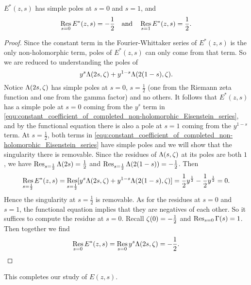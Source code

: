       \begin{proposition}\label{equ:completed_real-analytic_Eisenstein_series_residues}
        $E^{\ast}(z,s)$ has simple poles at $s = 0$ and $s = 1$, and
        \[
          \operatorname*{\mathrm{Res}}_{s = 0}E^{\ast}(z,s) = -\frac{1}{2} \quad \text{and} \quad \operatorname*{\mathrm{Res}}_{s = 1}E^{\ast}(z,s) = \frac{1}{2}.
        \]
      \end{proposition}
      \begin{proof}
        Since the constant term in the Fourier-Whittaker series of $E^{\ast}(z,s)$ is the only non-holomorphic term, poles of $E^{\ast}(z,s)$ can only come from that term. So we are reduced to understanding the poles of
        \begin{equation}\label{equ:constant_coefficient_of_completed_non-holomorphic_Eisenstein_series}
          y^{s}\Lambda(2s,\zeta)+y^{1-s}\Lambda(2(1-s),\zeta).
        \end{equation}
        Notice $\Lambda(2s,\zeta)$ has simple poles at $s = 0$, $s = \frac{1}{2}$ (one from the Riemann zeta function and one from the gamma factor) and no others. It follows that $E^{\ast}(z,s)$ has a simple pole at $s = 0$ coming from the $y^{s}$ term in
        \cref{equ:constant_coefficient_of_completed_non-holomorphic_Eisenstein_series}, and by the functional equation there is also a pole at $s = 1$ coming from the $y^{1-s}$ term. At $s = \frac{1}{2}$, both terms in \cref{equ:constant_coefficient_of_completed_non-holomorphic_Eisenstein_series} have simple poles and we will show that the singularity there is removable. Since the residues of $\Lambda(s,\zeta)$ at its poles are both $1$, we have $\operatorname*{\mathrm{Res}}_{s = \frac{1}{2}}\Lambda(2s) = \frac{1}{2}$ and $\operatorname*{\mathrm{Res}}_{s = \frac{1}{2}}\Lambda(2(1-s)) = -\frac{1}{2}$. Then
        \[
          \operatorname*{\mathrm{Res}}_{s = \frac{1}{2}}E^{\ast}(z,s) = \operatorname*{\mathrm{Res}}_{s = \frac{1}{2}}[y^{s}\Lambda(2s,\zeta)+y^{1-s}\Lambda(2(1-s),\zeta)] = \frac{1}{2}y^{\frac{1}{2}}-\frac{1}{2}y^{\frac{1}{2}} = 0.
        \]
        Hence the singularity at $s = \frac{1}{2}$ is removable. As for the residues at $s = 0$ and $s = 1$, the functional equation implies that they are negatives of each other. So it suffices to compute the residue at $s = 0$. Recall $\zeta(0) = -\frac{1}{2}$ and $\operatorname*{\mathrm{Res}}_{s = 0}\Gamma(s) = 1$. Then together we find
        \[
          \operatorname*{\mathrm{Res}}_{s = 0}E^{\ast}(z,s) = \operatorname*{\mathrm{Res}}_{s = 0}y^{s}\Lambda(2s,\zeta) = -\frac{1}{2}.
        \]
      \end{proof}

      This completes our study of $E(z,s)$.
